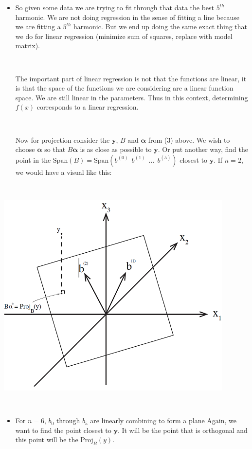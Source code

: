 \documentclass[]{article}
\begin{document}
\begin{itemize} \item[ ] 
So given some data we are trying to fit through that data the best $5^{th}$ harmonic. We are not doing regression in the sense of fitting a line because we are fitting a $5^{th}$ harmonic. But we end up doing the same exact thing that we do for linear regression (minimize sum of squares, replace with model matrix).


\ 




The important part of linear regression is not that the functions are linear, it is that the space of the functions we are considering are a linear function space. We are still linear in the parameters. Thus in this context, determining $f(x)$ corresponds to a linear regression.


\ 

 Now for projection consider the ${\bm y}$, $B$ and ${\bm \alpha}$ from (3) above. We wish to choose ${\bm \alpha}$ so that $B{\bm \alpha}$ is as close as possible to ${\bm y}$. Or put another way, find the point in the $\text{Span}(B) = \text{Span}\left(b^{(0)} \ \ b^{(1)} \ \ \dots \ \ b^{(5)}\right)$ closest to ${\bm y}$. If $n=2$, we would have a visual like this:
\end{itemize}

~

\hfil \includegraphics{proj2.png}

~

\begin{itemize} \item[ ] 
For $n=6$, $b_{0}$ through $b_{5}$ are linearly combining to form a plane Again, we want to find the point closest to ${\bm y}$. It will be the point that is orthogonal and this point will be the $\text{Proj}_B(y)$.
\end{itemize}
\end{document}
